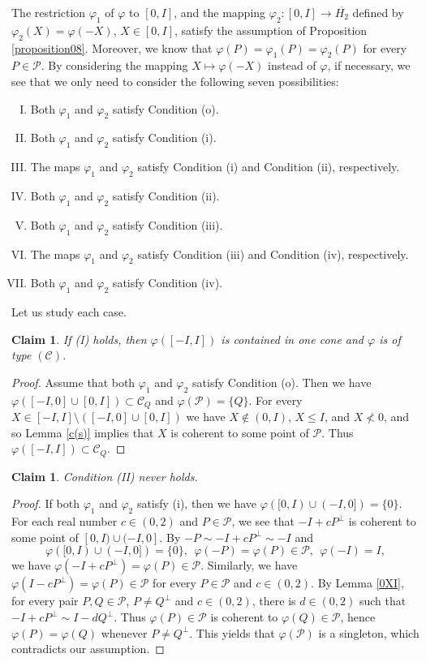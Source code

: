 \documentclass[10pt]{amsart}
\newtheorem{claim}[theorem]{Claim}
\theoremstyle{definition}
\theoremstyle{remark}
\numberwithin{subsection}{section}
\numberwithin{equation}{section}
\newcommand\cC{{\mathcal{C}}}
\newcommand\cP{{\mathcal{P}}}
\newcommand\oH{{\overline{H_2}}}
\begin{document}
The restriction $\varphi_1$ of $\varphi$ to $[0, I]$, and the mapping $\varphi_2\colon [0, I]\to \oH$ defined by $\varphi_2(X)=\varphi(-X)$, $X\in [0, I]$, satisfy the assumption of Proposition \ref{proposition08}. 
Moreover, we know that $\varphi(P)=\varphi_1(P)=\varphi_2(P)$ for every $P\in \cP$.
By considering the mapping $X\mapsto \varphi(-X)$ instead of $\varphi$, if necessary, we see that we only need to consider the following seven possibilities: 
\begin{enumerate}[(I)]
\item  Both $\varphi_1$ and $\varphi_2$ satisfy Condition (o). 
\item  Both $\varphi_1$ and $\varphi_2$ satisfy Condition (i). 
\item  The maps $\varphi_1$ and $\varphi_2$ satisfy Condition (i) and Condition (ii), respectively. 
\item  Both $\varphi_1$ and $\varphi_2$ satisfy Condition (ii). 
\item  Both $\varphi_1$ and $\varphi_2$ satisfy Condition (iii). 
\item  The maps $\varphi_1$ and $\varphi_2$ satisfy Condition (iii) and Condition (iv), respectively.
\item  Both $\varphi_1$ and $\varphi_2$ satisfy Condition (iv). 
\end{enumerate}

Let us study each case.

\begin{claim}
If (I) holds, then $\varphi ([-I,I])$ is contained in one cone and $\varphi$ is of type $(\mathcal{C})$.
\end{claim}
\begin{proof}
Assume that both $\varphi_1$ and $\varphi_2$ satisfy Condition (o). 
Then we have $\varphi([-I,0]\cup [0,I])\subset \cC_Q$ and $\varphi(\cP)=\{Q\}$. 
For every $X\in [-I,I]\setminus([-I,0]\cup [0,I])$ we have $X \not\in (0,I)$, $X \le I$, and $X\not< 0$, and so Lemma \ref{c(s)} implies that $X$ is coherent to some point of $\cP$.
Thus $\varphi([-I,I])\subset \cC_Q$. 
\end{proof}


\begin{claim}\label{(II)}
Condition (II) never holds.
\end{claim}
\begin{proof}
If both $\varphi_1$ and $\varphi_2$ satisfy (i), then we have $\varphi([0, I)\cup (-I, 0])=\{0\}$. 
For each real number $c\in (0, 2)$ and $P\in \cP$, we see that $-I+cP^\perp$ is coherent to some point of $[0, I)\cup (-I, 0]$. 
By $-P\sim -I+cP^\perp \sim -I$ and 
\[
\varphi([0, I)\cup (-I, 0])=\{0\},\ \  \varphi(-P)=\varphi(P)\in \cP, \ \  \varphi(-I)=I,
\] we have $\varphi(-I+cP^\perp)=\varphi(P)\in \cP$. 
Similarly, we have $\varphi(I-cP^\perp)=\varphi(P)\in \cP$ for every $P\in \cP$ and $c\in (0, 2)$. 
By Lemma \ref{0XI}, for every pair $P, Q\in \cP$, $P \not= Q^\perp$ and  $c\in (0, 2)$, there is $d\in (0,2)$ such that $-I+cP^\perp\sim I-dQ^\perp$. 
Thus $\varphi(P)\in \cP$ is coherent to $\varphi(Q)\in \cP$, hence $\varphi(P)=\varphi(Q)$ whenever $P \not= Q^\perp$.
This yields that $\varphi(\cP)$ is a singleton, which contradicts our assumption.
\end{proof}
\end{document}
